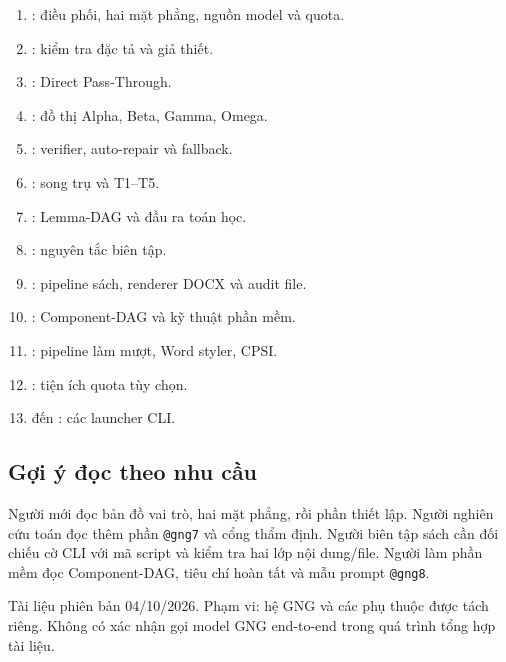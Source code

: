 \documentclass[11pt,a4paper]{article}
\makeatletter
\newcommand{\agent}[1]{\texttt{@gng#1}}
\newcommand{\code}[1]{\texttt{\detokenize{#1}}}
\makeatother
\begin{document}
\begin{enumerate}[label=\textbf{G\arabic*.}]
\item {}: điều phối, hai mặt phẳng, nguồn model và quota.
\item {}: kiểm tra đặc tả và giả thiết.
\item {}: Direct Pass-Through.
\item {}: đồ thị Alpha, Beta, Gamma, Omega.
\item {}: verifier, auto-repair và fallback.
\item {}: song trụ và T1--T5.
\item {}: Lemma-DAG và đầu ra toán học.
\item {}: nguyên tắc biên tập.
\item {}: pipeline sách, renderer DOCX và audit file.
\item {}: Component-DAG và kỹ thuật phần mềm.
\item {}: pipeline làm mượt, Word styler, CPSI.
\item {}: tiện ích quota tùy chọn.
\item \code{gng1.py} đến \code{gng8.py}: các launcher CLI.
\end{enumerate}

\subsection*{Gợi ý đọc theo nhu cầu}
Người mới đọc bản đồ vai trò, hai mặt phẳng, rồi phần thiết lập. Người nghiên cứu toán đọc thêm phần \agent{7} và cổng thẩm định. Người biên tập sách cần đối chiếu cờ CLI với mã script và kiểm tra hai lớp nội dung/file. Người làm phần mềm đọc Component-DAG, tiêu chí hoàn tất và mẫu prompt \agent{8}.

\vfill
{\small\color{muted}Tài liệu phiên bản 04/10/2026. Phạm vi: hệ GNG và các phụ thuộc được tách riêng. Không có xác nhận gọi model GNG end-to-end trong quá trình tổng hợp tài liệu.}
\end{document}
